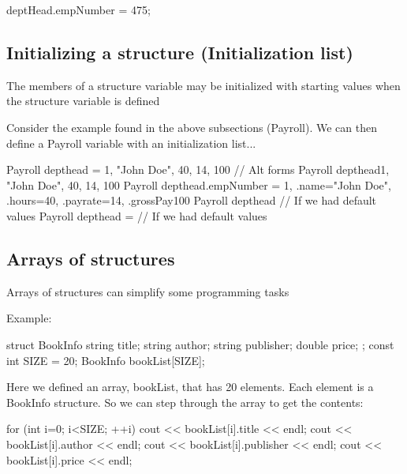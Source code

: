 \documentclass{report}
\begin{document}
	\begin{cppcode}
deptHead.empNumber = 475;
	\end{cppcode}
	

	\bigbreak \noindent 
	\subsection{Initializing a structure (Initialization list)}
	\bigbreak \noindent 
	\begin{concept}
	   The members of a structure variable may be initialized with starting values when the structure variable is defined 
	\end{concept}
	\bigbreak \noindent 
	Consider the example found in the above subsections (Payroll). We can then define a Payroll variable with an initialization list...
	\bigbreak \noindent 
	
	\begin{cppcode}
Payroll depthead = {1, "John Doe", 40, 14, 100}
// Alt forms
Payroll depthead{1, "John Doe", 40, 14, 100} 
Payroll depthead{.empNumber = 1, .name="John Doe", .hours=40, .payrate=14, .grossPay100}
Payroll depthead{} // If we had default values
Payroll depthead = {} // If we had default values
	\end{cppcode}
	

	\pagebreak
	\subsection{Arrays of structures}
	\bigbreak \noindent 
	\begin{concept}
	   Arrays of structures can simplify some programming tasks 
	\end{concept}
	\bigbreak \noindent 
	Example:
	\bigbreak \noindent 
	
	\begin{cppcode}
struct BookInfo {
    string title;
    string author;
    string publisher;
    double price;
};
const int SIZE = 20;
BookInfo bookList[SIZE];
	\end{cppcode}
	
	\bigbreak \noindent 
	Here we defined an array, bookList, that has 20 elements. Each element is a BookInfo structure.
	\bigbreak \noindent 
	So we can step through the array to get the contents:
	\bigbreak \noindent 
	
	\begin{cppcode}
for (int i=0; i<SIZE; ++i) {
        cout << bookList[i].title << endl;
        cout << bookList[i].author << endl;
        cout << bookList[i].publisher << endl;
        cout << bookList[i].price << endl;
    }
	\end{cppcode}
	
\end{document}
